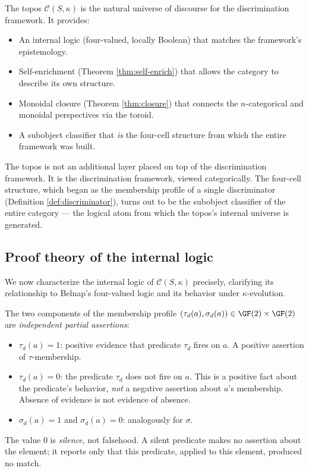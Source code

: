 \begin{remark}
The topos $\mathcal{C}(S,\kappa)$ is the natural universe
of discourse for the discrimination framework. It provides:
\begin{itemize}[nosep]
  \item An internal logic (four-valued, locally Boolean)
    that matches the framework's epistemology.
  \item Self-enrichment (Theorem \ref{thm:self-enrich})
    that allows the category to describe its own structure.
  \item Monoidal closure (Theorem \ref{thm:closure}) that
    connects the $n$-categorical and monoidal perspectives
    via the toroid.
  \item A subobject classifier that \emph{is} the
    four-cell structure from which the entire framework
    was built.
\end{itemize}
The topos is not an additional layer placed on top of the
discrimination framework. It is the discrimination
framework, viewed categorically. The four-cell structure,
which began as the membership profile of a single
discriminator (Definition \ref{def:discriminator}), turns
out to be the subobject classifier of the entire category
--- the logical atom from which the topos's internal
universe is generated.
\end{remark}

\subsection{Proof theory of the internal logic}\label{sec:proof-theory}

We now characterize the internal logic of
$\mathcal{C}(S,\kappa)$ precisely, clarifying its
relationship to Belnap's four-valued logic and its
behavior under $\kappa$-evolution.

\begin{definition}\label{def:evidence}
The two components of the membership profile
$(\tau_d(a), \sigma_d(a)) \in \GF(2) \times \GF(2)$
are \emph{independent partial assertions}:
\begin{itemize}[nosep]
  \item $\tau_d(a) = 1$: positive evidence that predicate
    $\tau_d$ fires on $a$. A positive assertion of
    $\tau$-membership.
  \item $\tau_d(a) = 0$: the predicate $\tau_d$ does not
    fire on $a$. This is a positive fact about the
    predicate's behavior, \emph{not} a negative assertion
    about $a$'s membership. Absence of evidence is not
    evidence of absence.
  \item $\sigma_d(a) = 1$ and $\sigma_d(a) = 0$:
    analogously for $\sigma$.
\end{itemize}
The value $0$ is \emph{silence}, not falsehood. A
silent predicate makes no assertion about the element;
it reports only that this predicate, applied to this
element, produced no match.
\end{definition}

